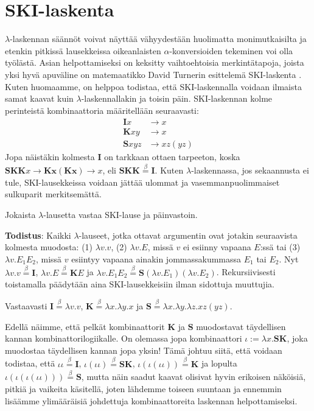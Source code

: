 \documentclass[a4paper,12pt]{amsart}
\begin{document}
\section{SKI-laskenta}
$\lambda$-laskennan säännöt voivat näyttää vähyydestään huolimatta monimutkaisilta ja etenkin pitkissä lausekkeissa oikeanlaisten $\alpha$-konversioiden tekeminen voi olla työlästä. Asian helpottamiseksi on keksitty vaihtoehtoisia merkintätapoja, joista yksi hyvä apuväline on matemaatikko David Turnerin esittelemä SKI-laskenta \cite{skilaskenta}. Kuten huomaamme, on helppoa todistaa, että SKI-laskennalla voidaan ilmaista samat kaavat kuin $\lambda$-laskennallakin ja toisin päin. SKI-laskennan kolme perinteistä kombinaattoria määritellään seuraavasti:
\begin{equation}\label{ski}
\begin{split}
\mathbf{I}x &\to x \\
\mathbf{K}xy &\to x \\
\mathbf{S}xyz &\to xz(yz)
\end{split}
\end{equation}
Jopa näistäkin kolmesta $\mathbf{I}$ on tarkkaan ottaen tarpeeton, koska $\mathbf{SKK}x\to\mathbf{Kx}(\mathbf{Kx})\to x$, eli $\mathbf{SKK}\stackrel{\beta}{=}\mathbf{I}$. Kuten $\lambda$-laskennassa, jos sekaannusta ei tule, SKI-lausekkeissa voidaan jättää ulommat ja vasemmanpuolimmaiset sulkuparit merkitsemättä.
\begin{lause}\label{turner}
Jokaista $\lambda$-lausetta vastaa SKI-lause ja päinvastoin.

{\bf Todistus}: Kaikki $\lambda$-lauseet, jotka ottavat argumentin ovat jotakin seuraavista kolmesta muodosta: (1) $\lambda v.v$, (2) $\lambda v.E$, missä $v$ ei esiinny vapaana $E$:ssä tai (3) $\lambda v.E_1 E_2$, missä $v$ esiintyy vapaana ainakin jommassakummassa $E_1$ tai $E_2$. Nyt $\lambda v.v\stackrel{\beta}{=}\mathbf{I}$, $\lambda v.E\stackrel{\beta}{=}\mathbf{K}E$ ja $\lambda v.E_1 E_2\stackrel{\beta}{=}\mathbf{S}(\lambda v.E_1)(\lambda v.E_2)$. Rekursiivisesti toistamalla päädytään aina SKI-lausekkeisiin ilman sidottuja muuttujia.

Vastaavasti $\mathbf{I}\stackrel{\beta}{=}\lambda v.v$, $\mathbf{K}\stackrel{\beta}{=}\lambda x.\lambda y.x$ ja $\mathbf{S}\stackrel{\beta}{=}\lambda x.\lambda y.\lambda z.xz(yz)$.
\end{lause}
Edellä näimme, että pelkät kombinaattorit $\mathbf{K}$ ja $\mathbf{S}$ muodostavat täydellisen kannan kombinattorilogiikalle. On olemassa jopa kombinaattori $\iota:=\lambda x.\mathbf{SK}$, joka muodostaa täydellisen kannan jopa yksin! \cite{iota} Tämä johtuu siitä, että voidaan todistaa, että $\iota\iota\stackrel{\beta}{=}\mathbf{I}$, $\iota(\iota\iota)\stackrel{\beta}{=}\mathbf{SK}$, $\iota(\iota(\iota\iota))\stackrel{\beta}{=}\mathbf{K}$ ja lopulta $\iota(\iota(\iota(\iota\iota)))\stackrel{\beta}{=}\mathbf{S}$, mutta näin saadut kaavat olisivat hyvin erikoisen näköisiä, pitkiä ja vaikeita käsitellä, joten lähdemme toiseen suuntaan ja ennemmin lisäämme ylimääräisiä johdettuja kombinaattoreita laskennan helpottamiseksi.
\end{document}
